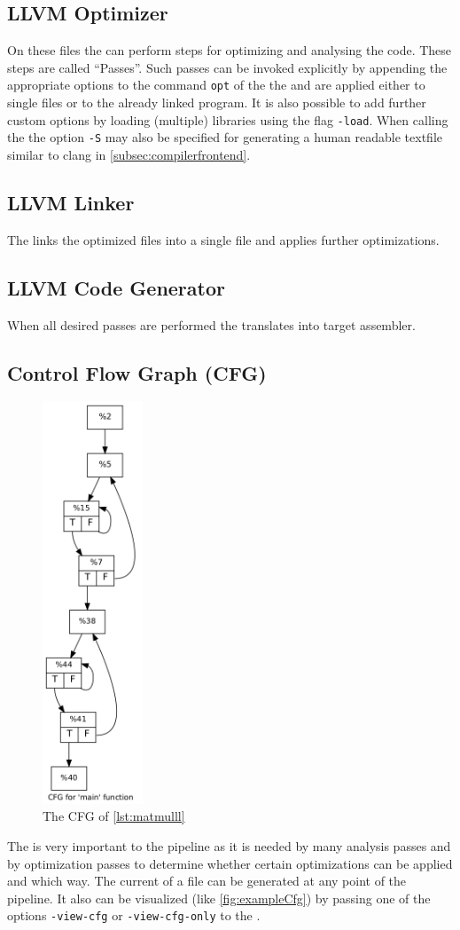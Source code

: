 \subsection{LLVM Optimizer}\label{subsec:optimizer}
On these files the \opt can perform steps for optimizing and analysing the code.
These steps are called \enquote{Passes}.
Such passes can be invoked explicitly by appending the appropriate options to the command \texttt{opt} of the the \opt and are applied either to single files or to the already linked program.
It is also possible to add further custom options by loading (multiple) libraries using the flag \texttt{-load}.
When calling the \opt the option \texttt{-S} may also be specified for generating a human readable textfile similar to clang in \autoref{subsec:compilerfrontend}.
\subsection{LLVM Linker}
The \linker links the optimized \llvmir files into a single \llvmir file and applies further optimizations.
\subsection{LLVM Code Generator}
When all desired passes are performed the \generator translates \llvmir into target assembler.
\subsection{Control Flow Graph (CFG)}\label{subsec:cfg}
\begin{figure}
    \caption{The CFG of \autoref{lst:matmulll}}
    \label{fig:exampleCfg}
    \includegraphics[height=12cm]{gfx/matmulCfg.png}
\end{figure}
The \cfg is very important to the pipeline as it is needed by many analysis passes and by optimization passes to determine whether certain optimizations can be applied and which way.
The current \cfg of a \llvmir file can be generated at any point of the pipeline.
It also can be visualized (like \autoref{fig:exampleCfg}) by passing one of the options \texttt{-view-cfg} or \texttt{-view-cfg-only} to the \opt.
